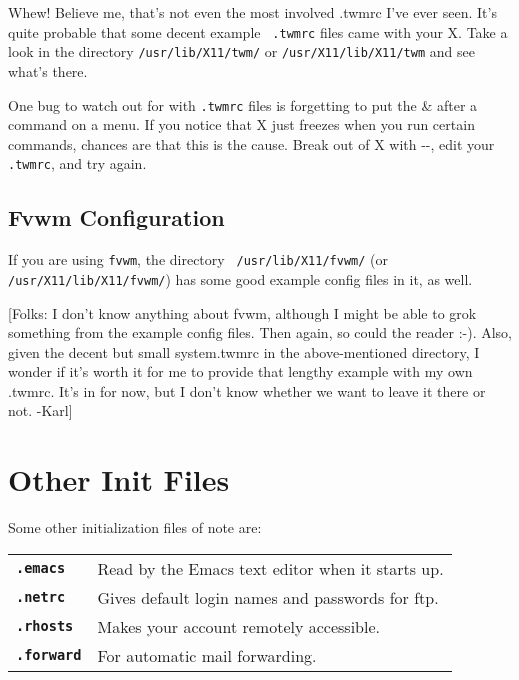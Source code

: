         Whew!  Believe me, that's not even the most involved .twmrc
I've ever seen.  It's quite probable that some decent example {\tt
.twmrc} files came with your X.  Take a look in the directory
{\tt /usr/lib/X11/twm/} or {\tt /usr/X11/lib/X11/twm} and see what's
there.

        One bug to watch out for with {\tt .twmrc} files is forgetting
to put the \& after a command on a menu.  If you notice that X
just freezes when you run certain commands, chances are that this is
the cause.  Break out of X with
--, edit your {\tt .twmrc}, and
try again.

\subsection{Fvwm Configuration}\label{fvwm-config-section}

        If you are using {\tt fvwm}, the directory {\tt
/usr/lib/X11/fvwm/} (or {\tt /usr/X11/lib/X11/fvwm/}) has some good
example config files in it, as well.

        [Folks: I don't know anything about fvwm, although I might be
able to grok something from the example config files.  Then again, so
could the reader :-).  Also, given the decent but small system.twmrc
in the above-mentioned directory, I wonder if it's worth it for me to
provide that lengthy example with my own .twmrc.  It's in for now, but
I don't know whether we want to leave it there or not.  -Karl]

\section{Other Init Files}

        Some other initialization files of note are:

\begin{samepage}
\begin{tabular}{ll}
{\bf {\tt .emacs}}    & Read by the Emacs text editor when it starts up. \\
{\bf {\tt .netrc}}    & Gives default login names and passwords for ftp. \\
{\bf {\tt .rhosts}}   & Makes your account remotely accessible. \\
{\bf {\tt .forward}}  & For automatic mail forwarding. \\
\end{tabular}
\end{samepage}

